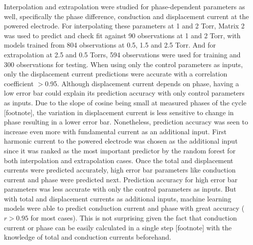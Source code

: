 \documentclass[12pt]{iopart}
\begin{document}
Interpolation and extrapolation were studied for phase-dependent parameters as well, specifically the phase difference, conduction and displacement current at the powered electrode. For interpolating these parameters at 1 and 2 Torr, Matrix 2 was used to predict and check fit against 90 observations at 1 and 2 Torr, with models trained from 804 observations at 0.5, 1.5 and 2.5 Torr. And for extrapolation at 2.5 and 0.5 Torrs, 594 observations were used for training and 300 observations for testing. When using only the control parameters as inputs, only the displacement current predictions were accurate with a correlation coefficient $>$0.95. Although displacement current depends on phase, having a low error bar could explain its prediction accuracy with only control parameters as inputs. Due to the slope of cosine being small at measured phases of the cycle [footnote], the variation in displacement current is less sensitive to change in phase resulting in a lower error bar. Nonetheless, prediction accuracy was seen to increase even more with fundamental current as an additional input. First harmonic current to the powered electrode was chosen as the additional input since it was ranked as the most important predictor by the random forest for both interpolation and extrapolation cases. Once the total and displacement currents were predicted accurately, high error bar parameters like conduction current and phase were predicted next. Prediction accuracy for high error bar parameters was less accurate with only the control parameters as inputs. But with total and displacement currents as additional inputs, machine learning models were able to predict conduction current and phase with great accuracy ($r>0.95$ for most cases). This is not surprising given the fact that conduction current or phase can be easily calculated in a single step [footnote] with the knowledge of total and conduction currents beforehand.



\end{document}
